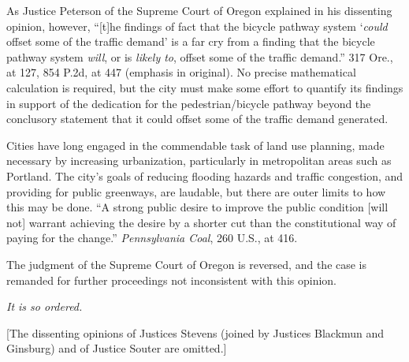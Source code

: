 As Justice Peterson of the Supreme Court of Oregon explained in his dissenting
opinion, however, ``[t]he findings of fact that the bicycle pathway system
`\textit{could} offset some of the traffic demand' is a far cry from a finding
that the bicycle pathway system \textit{will}, or is \textit{likely to}, offset
some of the traffic demand.'' 317 Ore., at 127, 854 P.2d, at 447 (emphasis in
original). No precise mathematical calculation is required, but the city must
make some effort to quantify its findings in support of the dedication for the
pedestrian/bicycle pathway beyond the conclusory statement that it could offset
some of the traffic demand generated.



Cities have long engaged in the commendable task of land use planning, made
necessary by increasing urbanization, particularly in metropolitan areas such as
Portland. The city's goals of reducing flooding hazards and traffic congestion,
and providing for public greenways, are laudable, but there are outer limits to
how this may be done. ``A strong public desire to improve the public condition
[will not] warrant achieving the desire by a shorter cut than the constitutional
way of paying for the change.'' \textit{Pennsylvania Coal}, 260 U.S., at 416.

The judgment of the Supreme Court of Oregon is reversed, and the case is
remanded for further proceedings not inconsistent with this opinion.

\textit{It is so ordered.}

[The dissenting opinions of Justices Stevens (joined by Justices Blackmun and
Ginsburg) and of Justice Souter are omitted.]

